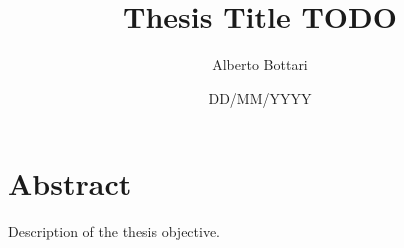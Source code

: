 \documentclass[12pt,a4paper,twoside,openright]{extreport}
\title{Thesis Title TODO}
\author{Alberto Bottari}
\date{DD/MM/YYYY}
\begin{document}
    \pagestyle{empty}

    
    \cleardoublepage

    
    \cleardoublepage

    \pagestyle{plain}

    \chapter*{Abstract}
    Description of the thesis objective.
    \cleardoublepage

    \tableofcontents
    \cleardoublepage

    \listoffigures
    \cleardoublepage


    

    \printbibliography[heading=bibintoc]
\end{document}
